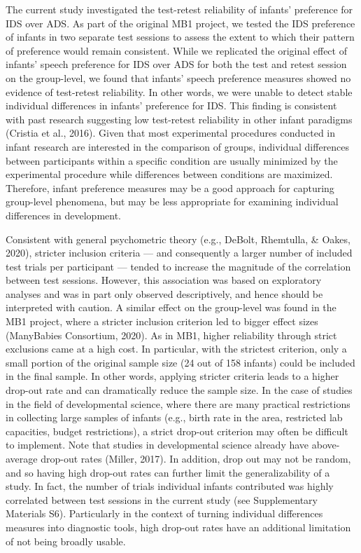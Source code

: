 \documentclass[
  man,floatsintext]{apa6}
\begin{document}
The current study investigated the test-retest reliability of infants' preference for IDS over ADS.
As part of the original MB1 project, we tested the IDS preference of infants in two separate test sessions to assess the extent to which their pattern of preference would remain consistent.
While we replicated the original effect of infants' speech preference for IDS over ADS for both the test and retest session on the group-level, we found that infants' speech preference measures showed no evidence of test-retest reliability.
In other words, we were unable to detect stable individual differences in infants' preference for IDS.
This finding is consistent with past research suggesting low test-retest reliability in other infant paradigms (Cristia et al., 2016).
Given that most experimental procedures conducted in infant research are interested in the comparison of groups, individual differences between participants within a specific condition are usually minimized by the experimental procedure while differences between conditions are maximized.
Therefore, infant preference measures may be a good approach for capturing group-level phenomena, but may be less appropriate for examining individual differences in development.

Consistent with general psychometric theory (e.g., DeBolt, Rhemtulla, \& Oakes, 2020), stricter inclusion criteria --- and consequently a larger number of included test trials per participant --- tended to increase the magnitude of the correlation between test sessions.
However, this association was based on exploratory analyses and was in part only observed descriptively, and hence should be interpreted with caution.
A similar effect on the group-level was found in the MB1 project, where a stricter inclusion criterion led to bigger effect sizes (ManyBabies Consortium, 2020).
As in MB1, higher reliability through strict exclusions came at a high cost.
In particular, with the strictest criterion, only a small portion of the original sample size (24 out of 158 infants) could be included in the final sample.
In other words, applying stricter criteria leads to a higher drop-out rate and can dramatically reduce the sample size.
In the case of studies in the field of developmental science, where there are many practical restrictions in collecting large samples of infants (e.g., birth rate in the area, restricted lab capacities, budget restrictions), a strict drop-out criterion may often be difficult to implement.
Note that studies in developmental science already have above-average drop-out rates (Miller, 2017).
In addition, drop out may not be random, and so having high drop-out rates can further limit the generalizability of a study.
In fact, the number of trials individual infants contributed was highly correlated between test sessions in the current study (see Supplementary Materials S6).
Particularly in the context of turning individual differences measures into diagnostic tools, high drop-out rates have an additional limitation of not being broadly usable.
\end{document}

